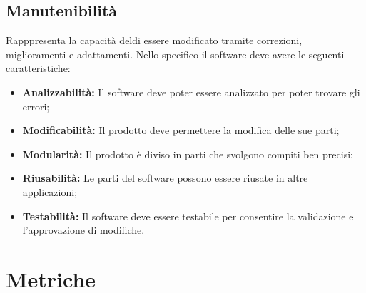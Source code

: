 \subsection{Manutenibilità}
Rapppresenta la capacità deldi essere modificato tramite correzioni, miglioramenti e adattamenti.
Nello specifico il software deve avere le seguenti caratteristiche:
\begin{itemize}
	\item \textbf{Analizzabilità:} Il software deve poter essere analizzato per poter trovare gli errori;
	\item \textbf{Modificabilità:} Il prodotto deve permettere la modifica delle sue parti;
	\item \textbf{Modularità:} Il prodotto è diviso in parti che svolgono compiti ben precisi;
	\item \textbf{Riusabilità:} Le parti del software possono essere riusate in altre applicazioni;
	\item \textbf{Testabilità:} Il software deve essere testabile per consentire la validazione e l'approvazione di modifiche.
\end{itemize}	

\section{Metriche}
